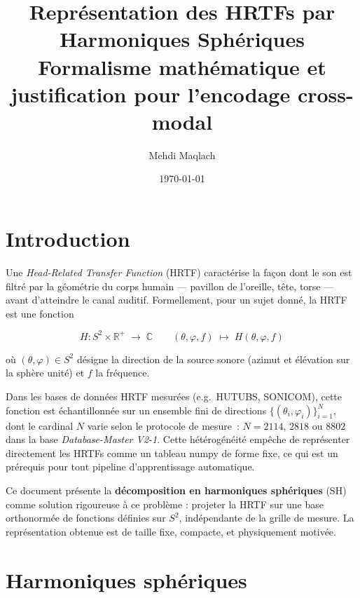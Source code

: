 \documentclass[12pt, a4paper]{article}
\title{%
    \textbf{Représentation des HRTFs par Harmoniques Sphériques}\\[0.4em]
    \large Formalisme mathématique et justification pour l'encodage cross-modal
}
\author{Mehdi Maqlach}
\date{\today}
\begin{document}
\maketitle
\tableofcontents
\vspace{1em}

\section{Introduction}

Une \textit{Head-Related Transfer Function} (HRTF) caractérise la façon dont le son
est filtré par la géométrie du corps humain — pavillon de l'oreille, tête, torse —
avant d'atteindre le canal auditif. Formellement, pour un sujet donné, la HRTF est
une fonction

\begin{equation}
    H : S^2 \times \mathbb{R}^+ \;\longrightarrow\; \mathbb{C}
    \qquad
    (\theta, \varphi, f) \;\longmapsto\; H(\theta, \varphi, f)
\end{equation}

où $(\theta, \varphi) \in S^2$ désigne la direction de la source sonore (azimut et
élévation sur la sphère unité) et $f$ la fréquence.

\medskip

Dans les bases de données HRTF mesurées (e.g.\ HUTUBS, SONICOM), cette fonction
est échantillonnée sur un ensemble fini de directions
$\{(\theta_i, \varphi_i)\}_{i=1}^{N}$, dont le cardinal $N$ varie selon le protocole
de mesure~: $N = 2114$, $2818$ ou $8802$ dans la base \textit{Database-Master V2-1}.
Cette hétérogénéité empêche de représenter directement les HRTFs comme un tableau
numpy de forme fixe, ce qui est un prérequis pour tout pipeline d'apprentissage
automatique.

\medskip

Ce document présente la \textbf{décomposition en harmoniques sphériques} (SH) comme
solution rigoureuse à ce problème : projeter la HRTF sur une base orthonormée de
fonctions définies sur $S^2$, indépendante de la grille de mesure. La représentation
obtenue est de taille fixe, compacte, et physiquement motivée.

\section{Harmoniques sphériques}
\end{document}
